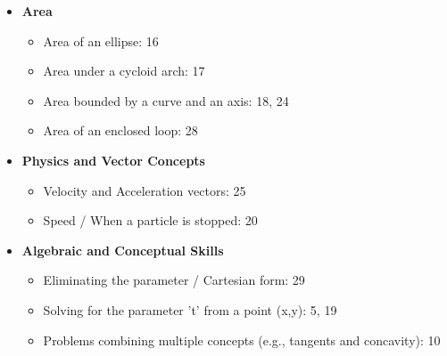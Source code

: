 \documentclass{article}
\begin{document}
\begin{itemize}
    \item \textbf{Area}
    \begin{itemize}
        \item Area of an ellipse: 16
        \item Area under a cycloid arch: 17
        \item Area bounded by a curve and an axis: 18, 24
        \item Area of an enclosed loop: 28
    \end{itemize}
    
    \item \textbf{Physics and Vector Concepts}
    \begin{itemize}
        \item Velocity and Acceleration vectors: 25
        \item Speed / When a particle is stopped: 20
    \end{itemize}

    \item \textbf{Algebraic and Conceptual Skills}
    \begin{itemize}
        \item Eliminating the parameter / Cartesian form: 29
        \item Solving for the parameter 't' from a point (x,y): 5, 19
        \item Problems combining multiple concepts (e.g., tangents and concavity): 10
    \end{itemize}
\end{itemize}
\end{document}
